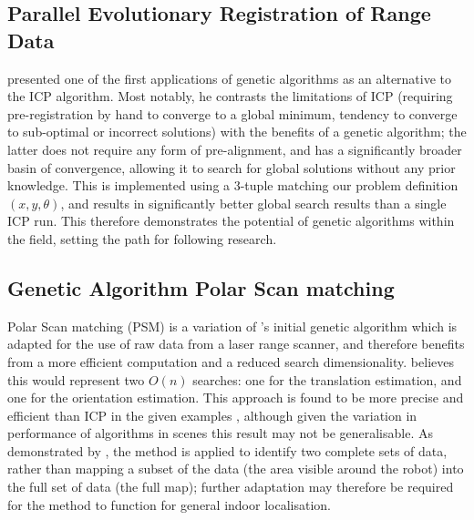 \documentclass[authoryearcitations]{UoYCSproject}
\begin{document}
\subsection{Parallel Evolutionary Registration of Range Data}
\citet{Robertson2002-ou} presented one of the first applications of genetic algorithms as an alternative to the ICP algorithm. Most notably, he contrasts the limitations of ICP (requiring pre-registration by hand to converge to a global minimum, tendency to converge to sub-optimal or incorrect solutions) with the benefits of a genetic algorithm; the latter does not require any form of pre-alignment, and has a significantly broader basin of convergence, allowing it to search for global solutions without any prior knowledge. This is implemented using a 3-tuple matching our problem definition $(x,y,\theta)$, and results in significantly better global search results than a single ICP run. This therefore demonstrates the potential of genetic algorithms within the field, setting the path for following research.

\subsection{Genetic Algorithm Polar Scan matching}
Polar Scan matching (PSM) is a variation of \citeauthor{Robertson2002-ou}'s initial genetic algorithm which is adapted for the use of raw data from a laser range scanner, and therefore benefits from a more efficient computation and a reduced search dimensionality. \citet{Ze-Su2007-li} believes this would represent two $O(n)$ searches: one for the translation estimation, and one for the orientation estimation. This approach is found to be more precise and efficient than ICP in the given examples \cite{Ze-Su2007-li} , although given the variation in performance of algorithms in scenes \cite{Donoso2017-wp} this result may not be generalisable. As demonstrated by \citeauthor{Ze-Su2007-li}, the method is applied to identify two complete sets of data, rather than mapping a subset of the data (the area visible around the robot) into the full set of data (the full map); further adaptation may therefore be required for the method to function for general indoor localisation.
\end{document}
